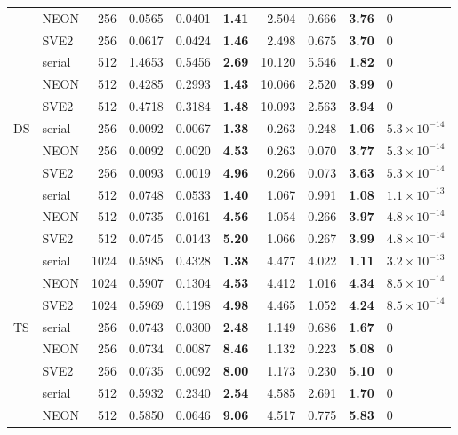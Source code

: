 \documentclass[a4j,dvipdfmx,11pt]{jsarticle}
\begin{document}
\begin{table}[p]
\begin{tabular}{llrrrrrrrl}
 & NEON & 256 & 0.0565 & 0.0401 & \textbf{1.41} & 2.504 & 0.666 & \textbf{3.76} & $0$ \\
 & SVE2 & 256 & 0.0617 & 0.0424 & \textbf{1.46} & 2.498 & 0.675 & \textbf{3.70} & $0$ \\
 & serial & 512 & 1.4653 & 0.5456 & \textbf{2.69} & 10.120 & 5.546 & \textbf{1.82} & $0$ \\
 & NEON & 512 & 0.4285 & 0.2993 & \textbf{1.43} & 10.066 & 2.520 & \textbf{3.99} & $0$ \\
 & SVE2 & 512 & 0.4718 & 0.3184 & \textbf{1.48} & 10.093 & 2.563 & \textbf{3.94} & $0$ \\
\midrule
DS & serial & 256 & 0.0092 & 0.0067 & \textbf{1.38} & 0.263 & 0.248 & \textbf{1.06} & $5.3\times10^{-14}$ \\
 & NEON & 256 & 0.0092 & 0.0020 & \textbf{4.53} & 0.263 & 0.070 & \textbf{3.77} & $5.3\times10^{-14}$ \\
 & SVE2 & 256 & 0.0093 & 0.0019 & \textbf{4.96} & 0.266 & 0.073 & \textbf{3.63} & $5.3\times10^{-14}$ \\
 & serial & 512 & 0.0748 & 0.0533 & \textbf{1.40} & 1.067 & 0.991 & \textbf{1.08} & $1.1\times10^{-13}$ \\
 & NEON & 512 & 0.0735 & 0.0161 & \textbf{4.56} & 1.054 & 0.266 & \textbf{3.97} & $4.8\times10^{-14}$ \\
 & SVE2 & 512 & 0.0745 & 0.0143 & \textbf{5.20} & 1.066 & 0.267 & \textbf{3.99} & $4.8\times10^{-14}$ \\
 & serial & 1024 & 0.5985 & 0.4328 & \textbf{1.38} & 4.477 & 4.022 & \textbf{1.11} & $3.2\times10^{-13}$ \\
 & NEON & 1024 & 0.5907 & 0.1304 & \textbf{4.53} & 4.412 & 1.016 & \textbf{4.34} & $8.5\times10^{-14}$ \\
 & SVE2 & 1024 & 0.5969 & 0.1198 & \textbf{4.98} & 4.465 & 1.052 & \textbf{4.24} & $8.5\times10^{-14}$ \\
\midrule
TS & serial & 256 & 0.0743 & 0.0300 & \textbf{2.48} & 1.149 & 0.686 & \textbf{1.67} & $0$ \\
 & NEON & 256 & 0.0734 & 0.0087 & \textbf{8.46} & 1.132 & 0.223 & \textbf{5.08} & $0$ \\
 & SVE2 & 256 & 0.0735 & 0.0092 & \textbf{8.00} & 1.173 & 0.230 & \textbf{5.10} & $0$ \\
 & serial & 512 & 0.5932 & 0.2340 & \textbf{2.54} & 4.585 & 2.691 & \textbf{1.70} & $0$ \\
 & NEON & 512 & 0.5850 & 0.0646 & \textbf{9.06} & 4.517 & 0.775 & \textbf{5.83} & $0$ \\

\end{tabular}
\end{table}
\end{document}
